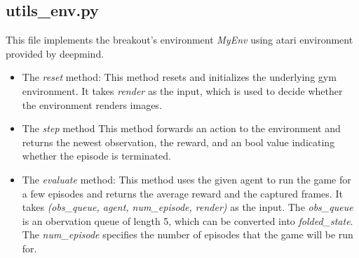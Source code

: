 \documentclass[a4paper, 11pt]{article}
\begin{document}
\subsection{utils\_env.py}
This file implements the breakout's environment \emph{MyEnv}
using atari environment provided by deepmind.
\begin{itemize}\setlength{\itemsep}{-\itemsep}
      \item The \emph{reset} method:
            This method resets and
            initializes the underlying gym environment.
            It takes \emph{render} as the input,
            which is used to decide whether
            the environment renders images.
      \item The \emph{step} method
            This method forwards an action to the environment
            and returns the newest observation, the reward,
            and an bool value indicating whether the
            episode is terminated.
      \item The \emph{evaluate} method:
            This method uses the given agent to run the game for
            a few episodes and returns the average reward
            and the captured frames.
            It takes \emph{(obs\_queue, agent, num\_episode, render)}
            as the input.
            The \emph{obs\_queue} is an obervation queue of length 5,
            which can be converted into \emph{folded\_state}.
            The \emph{num\_episode} specifies the number of episodes
            that the game will be run for.
\end{itemize}
\end{document}
